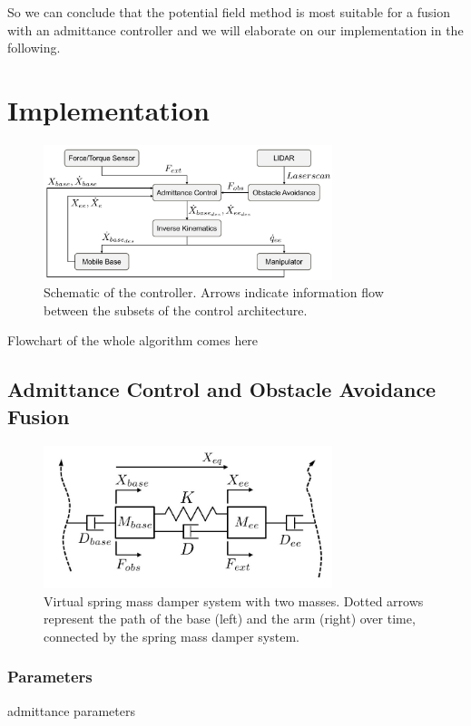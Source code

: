 So we can conclude that the potential field method is most suitable for a fusion with an admittance controller and we will elaborate on our implementation in the following.

\chapter{Implementation}
\begin{figure}
   \centering
   \includegraphics[width=0.75\textwidth]{images/controller_overview.jpg}
   \caption{Schematic of the controller. Arrows indicate information flow between the subsets of the control architecture.}
   \label{pics:controller_overview}
\end{figure}

Flowchart of the whole algorithm comes here
\section{Admittance Control and Obstacle Avoidance Fusion}
\begin{figure}
   \centering
   \includegraphics[width=0.75\textwidth]{images/admittance_model.jpg}
   \caption{Virtual spring mass damper system with two masses. Dotted arrows represent the path of the base (left) and the arm (right) over time, connected by the spring mass damper system.}
   \label{pics:admittance_model}
\end{figure}


\subsection{Parameters}
admittance parameters
